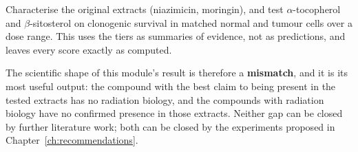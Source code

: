 \begin{keybox}[title={A defensible first-stage programme.}]
Characterise the original extracts (niazimicin, moringin), and test $\alpha$-tocopherol and
$\beta$-sitosterol on clonogenic survival in matched normal and tumour cells over a dose
range. This uses the tiers as summaries of evidence, not as predictions, and leaves every
score exactly as computed.
\end{keybox}

The scientific shape of this module's result is therefore a \textbf{mismatch}, and it is its
most useful output: the compound with the best claim to being present in the tested extracts
has no radiation biology, and the compounds with radiation biology have no confirmed presence
in those extracts. Neither gap can be closed by further literature work; both can be closed by
the experiments proposed in Chapter~\ref{ch:recommendations}.
